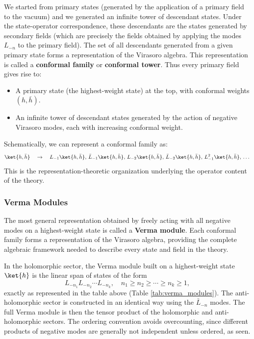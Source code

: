 We started from primary states (generated by the application of a primary field to the vacuum) and we generated an infinite tower of descendant states. Under the state-operator correspondence, these descendants are the states generated by secondary fields (which are precisely the fields obtained by applying the modes \(L_{-n}\) to the primary field). The set of all descendants generated from a given primary state forms a representation of the Virasoro algebra. This representation is called a \textbf{conformal family} or \textbf{conformal tower}. Thus every primary field gives rise to:
\begin{itemize}
    \item A primary state (the highest-weight state) at the top, with conformal weights \((h, \bar{h})\).
    \item An infinite tower of descendant states generated by the action of negative Virasoro modes, each with increasing conformal weight.
\end{itemize}

Schematically, we can represent a conformal family as:
\[
    \ket{h, \bar{h}} \quad \rightarrow \quad L_{-1}\ket{h, \bar{h}}, \, \bar{L}_{-1} \ket{h, \bar{h}}, \, L_{-2}\ket{h, \bar{h}}, \, \bar{L}_{-2} \ket{h, \bar{h}}, \, L_{-1}^2\ket{h, \bar{h}}, \, \dots
\]
This is the representation-theoretic organization underlying the operator content of the theory.

\subsubsection{Verma Modules}

The most general representation obtained by freely acting with all negative modes on a highest-weight state is called a \textbf{Verma module}. Each conformal family forms a representation of the Virasoro algebra, providing the complete algebraic framework needed to describe every state and field in the theory.

In the holomorphic sector, the Verma module built on a highest-weight state \(\ket{h}\) is the linear span of states of the form
\[
    L_{-n_1} L_{-n_2} \cdots L_{-n_k}, \quad n_1 \geq n_2 \geq \cdots \geq n_k \geq 1,
\]
exactly as represented in the table above (Table \ref{tab:verma_modules}). The anti-holomorphic sector is constructed in an identical way using the \(\bar{L}_{-n}\) modes. The full Verma module is then the tensor product of the holomorphic and anti-holomorphic sectors. The ordering convention avoids overcounting, since different products of negative modes are generally not independent unless ordered, as seen.


